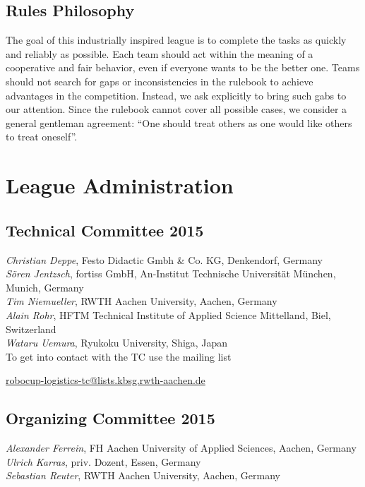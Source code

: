 \documentclass[12pt,twoside]{article}
\begin{document}
\subsection{Rules Philosophy}
\label{sec:rules-philosphy}
The goal of this industrially inspired league is to complete the tasks
as quickly and reliably as possible. Each team should act within the
meaning of a cooperative and fair behavior, even if everyone wants to
be the better one. Teams should not search for gaps or inconsistencies
in the rulebook to achieve advantages in the competition. Instead, we
ask explicitly to bring such gabs to our attention. Since the rulebook
cannot cover all possible cases, we consider a general gentleman
agreement: ``One should treat others as one would like others to treat
oneself''.


\section{League Administration} \label{sec:commitees}
\subsection{Technical Committee 2015} \label{sec:tc}
\emph{Christian Deppe}, Festo Didactic Gmbh \& Co. KG, Denkendorf, Germany\\
\emph{S\"oren Jentzsch}, fortiss GmbH, An-Institut Technische Universit\"at M\"unchen, Munich, Germany\\
\emph{Tim Niemueller}, RWTH Aachen University, Aachen, Germany\\
\emph{Alain Rohr}, HFTM Technical Institute of Applied Science Mittelland, Biel, Switzerland\\
\emph{Wataru Uemura}, Ryukoku University, Shiga, Japan\\

\noindent
To get into contact with the TC use the mailing list\\
\centerline{\url{robocup-logistics-tc@lists.kbsg.rwth-aachen.de}}

\subsection{Organizing Committee 2015} \label{sec:oc} 
\emph{Alexander Ferrein}, FH Aachen University of Applied Sciences, Aachen, Germany\\
\emph{Ulrich Karras}, priv. Dozent, Essen, Germany\\
\emph{Sebastian Reuter}, RWTH Aachen University, Aachen, Germany\\
\end{document}
